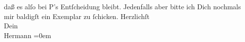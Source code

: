 \begin{ledgroupsized}[t]{13cm}
               daß es alſo bei P’s Entſcheidung bleibt.\pend
           \pstart
           Jedenfalls aber bitte ich Dich nochmals mir baldigſt ein Exemplar zu ſchicken.\pend
           \pstart
           Herzlichſt{\\[\baselineskip]}Dein{\\[\baselineskip]}\spacefill\mbox{Hermann}\pend
           \leftskip=0em{}\endnumbering{}\end{ledgroupsized}  \newcommand{\dateiname}{L01283}\newcommand{\titel}{Hermann Bahr an Arthur Schnitzler, [30. 3. 1903]}\newcommand{\editorInnen}{ Kurt Ifkovits,  Martin Anton Müller}
      